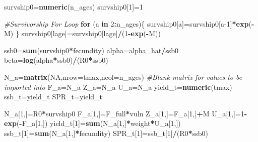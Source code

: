 \documentclass[
  12pt,
]{article}
\newenvironment{Shaded}{\begin{snugshade}}{\end{snugshade}}
\newcommand{\AttributeTok}[1]{\textcolor[rgb]{0.13,0.29,0.53}{#1}}
\newcommand{\CommentTok}[1]{\textcolor[rgb]{0.56,0.35,0.01}{\textit{#1}}}
\newcommand{\ConstantTok}[1]{\textcolor[rgb]{0.56,0.35,0.01}{#1}}
\newcommand{\ControlFlowTok}[1]{\textcolor[rgb]{0.13,0.29,0.53}{\textbf{#1}}}
\newcommand{\DecValTok}[1]{\textcolor[rgb]{0.00,0.00,0.81}{#1}}
\newcommand{\FunctionTok}[1]{\textcolor[rgb]{0.13,0.29,0.53}{\textbf{#1}}}
\newcommand{\NormalTok}[1]{#1}
\newcommand{\OtherTok}[1]{\textcolor[rgb]{0.56,0.35,0.01}{#1}}
\newcommand{\SpecialCharTok}[1]{\textcolor[rgb]{0.81,0.36,0.00}{\textbf{#1}}}
\begin{document}
\begin{Shaded}
\begin{Highlighting}[]
\NormalTok{survship0}\OtherTok{=}\FunctionTok{numeric}\NormalTok{(n\_ages)}
\NormalTok{survship0[}\DecValTok{1}\NormalTok{]}\OtherTok{=}\DecValTok{1}

\CommentTok{\#Survivorship For Loop}
\ControlFlowTok{for}\NormalTok{ (a }\ControlFlowTok{in} \DecValTok{2}\SpecialCharTok{:}\NormalTok{n\_ages)\{}
\NormalTok{  survship0[a]}\OtherTok{=}\NormalTok{survship0[a}\DecValTok{{-}1}\NormalTok{]}\SpecialCharTok{*}\FunctionTok{exp}\NormalTok{(}\SpecialCharTok{{-}}\NormalTok{M)}
\NormalTok{\}}
\NormalTok{survship0[lage]}\OtherTok{=}\NormalTok{survship0[lage]}\SpecialCharTok{/}\NormalTok{(}\DecValTok{1}\SpecialCharTok{{-}}\FunctionTok{exp}\NormalTok{(}\SpecialCharTok{{-}}\NormalTok{M))}

\NormalTok{ssb0}\OtherTok{=}\FunctionTok{sum}\NormalTok{(survship0}\SpecialCharTok{*}\NormalTok{fecundity)}
\NormalTok{alpha}\OtherTok{=}\NormalTok{alpha\_hat}\SpecialCharTok{/}\NormalTok{ssb0}
\NormalTok{beta}\OtherTok{=}\FunctionTok{log}\NormalTok{(alpha}\SpecialCharTok{*}\NormalTok{ssb0)}\SpecialCharTok{/}\NormalTok{(R0}\SpecialCharTok{*}\NormalTok{ssb0)}


\NormalTok{N\_a}\OtherTok{=}\FunctionTok{matrix}\NormalTok{(}\ConstantTok{NA}\NormalTok{,}\AttributeTok{nrow=}\NormalTok{tmax,}\AttributeTok{ncol=}\NormalTok{n\_ages) }\CommentTok{\#Blank matrix for values to be imported into}
\NormalTok{F\_a}\OtherTok{=}\NormalTok{N\_a}
\NormalTok{Z\_a}\OtherTok{=}\NormalTok{N\_a}
\NormalTok{U\_a}\OtherTok{=}\NormalTok{N\_a}
\NormalTok{yield\_t}\OtherTok{=}\FunctionTok{numeric}\NormalTok{(tmax)}
\NormalTok{ssb\_t}\OtherTok{=}\NormalTok{yield\_t}
\NormalTok{SPR\_t}\OtherTok{=}\NormalTok{yield\_t}

\NormalTok{N\_a[}\DecValTok{1}\NormalTok{,]}\OtherTok{=}\NormalTok{R0}\SpecialCharTok{*}\NormalTok{survship0}
\NormalTok{F\_a[}\DecValTok{1}\NormalTok{,]}\OtherTok{=}\NormalTok{F\_full}\SpecialCharTok{*}\NormalTok{vuln}
\NormalTok{Z\_a[}\DecValTok{1}\NormalTok{,]}\OtherTok{=}\NormalTok{F\_a[}\DecValTok{1}\NormalTok{,]}\SpecialCharTok{+}\NormalTok{M}
\NormalTok{U\_a[}\DecValTok{1}\NormalTok{,]}\OtherTok{=}\DecValTok{1}\SpecialCharTok{{-}}\FunctionTok{exp}\NormalTok{(}\SpecialCharTok{{-}}\NormalTok{F\_a[}\DecValTok{1}\NormalTok{,])}
\NormalTok{yield\_t[}\DecValTok{1}\NormalTok{]}\OtherTok{=}\FunctionTok{sum}\NormalTok{(N\_a[}\DecValTok{1}\NormalTok{,]}\SpecialCharTok{*}\NormalTok{weight}\SpecialCharTok{*}\NormalTok{U\_a[}\DecValTok{1}\NormalTok{,])}
\NormalTok{ssb\_t[}\DecValTok{1}\NormalTok{]}\OtherTok{=}\FunctionTok{sum}\NormalTok{(N\_a[}\DecValTok{1}\NormalTok{,]}\SpecialCharTok{*}\NormalTok{fecundity)}
\NormalTok{SPR\_t[}\DecValTok{1}\NormalTok{]}\OtherTok{=}\NormalTok{ssb\_t[}\DecValTok{1}\NormalTok{]}\SpecialCharTok{/}\NormalTok{(R0}\SpecialCharTok{*}\NormalTok{ssb0)}


\end{Highlighting}
\end{Shaded}
\end{document}
